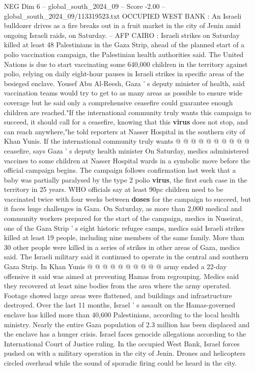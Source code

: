 \begin{textsample}{NEG Dim 6 – global\_south\_2024\_09 – Score -2.00 – global\_south\_2024\_09/113319523.txt}  \label{ex:f6_neg_007}
OCCUPIED WEST BANK : An Israeli bulldozer drives as a fire breaks out in a fruit market in the city of Jenin amid ongoing Israeli raids, on Saturday. -- AFP CAIRO : Israeli strikes on Saturday killed at least 48 Palestinians in the Gaza Strip, ahead of the planned start of a polio vaccination campaign, the Palestinian health authorities said.
The United Nations is due to start vaccinating some 640,000 children in the territory against polio, relying on daily eight-hour pauses in Israeli strikes in specific areas of the besieged enclave.
Yousef Abu Al-Reesh, Gaza ' s deputy minister of health, said vaccination teams would try to get to as many areas as possible to ensure wide coverage but he said only a comprehensive ceasefire could guarantee enough children are reached."If the international community truly wants this campaign to succeed, it should call for a ceasefire, knowing that this \textbf{virus} does not stop, and can reach anywhere,"he told reporters at Nasser Hospital in the southern city of Khan Yunis.
If the international community truly wants @ @ @ @ @ @ @ @ @ @ ceasefire, says Gaza ' s deputy health minister On Saturday, medics administered vaccines to some children at Nasser Hospital wards in a symbolic move before the official campaign begins.
The campaign follows confirmation last week that a baby was partially paralysed by the type 2 polio \textbf{virus}, the first such case in the territory in 25 years.
WHO officials say at least 90pc children need to be vaccinated twice with four weeks between \textbf{doses} for the campaign to succeed, but it faces huge challenges in Gaza.
On Saturday, as more than 2,000 medical and community workers prepared for the start of the campaign, medics in Nuseirat, one of the Gaza Strip ' s eight historic refugee camps, medics said Israeli strikes killed at least 19 people, including nine members of the same family.
More than 30 other people were killed in a series of strikes in other areas of Gaza, medics said.
The Israeli military said it continued to operate in the central and southern Gaza Strip.
In Khan Yunis @ @ @ @ @ @ @ @ @ @ army ended a 22-day offensive it said was aimed at preventing Hamas from regrouping.
Medics said they recovered at least nine bodies from the area where the army operated.
Footage showed large areas were flattened, and buildings and infrastructure destroyed.
Over the last 11 months, Israel ' s assault on the Hamas-governed enclave has killed more than 40,600 Palestinians, according to the local health ministry.
Nearly the entire Gaza population of 2.3 million has been displaced and the enclave has a hunger crisis.
Israel faces genocide allegations according to the International Court of Justice ruling.
In the occupied West Bank, Israel forces pushed on with a military operation in the city of Jenin.
Drones and helicopters circled overhead while the sound of sporadic firing could be heard in the city.

\end{textsample}
